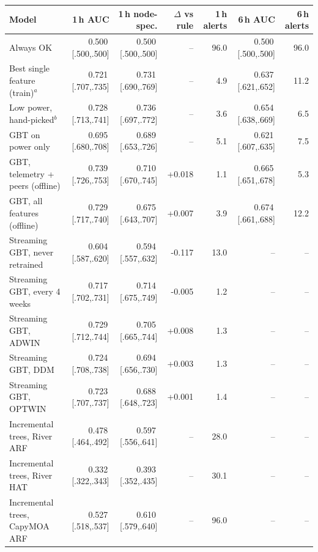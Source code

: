 \begin{tabular}{lrrrrrr}
\toprule
Model & 1\,h AUC & 1\,h node-spec. & $\Delta$ vs rule & 1\,h alerts & 6\,h AUC & 6\,h alerts \\
\midrule
Always OK & 0.500\,{\scriptsize[.500,.500]} & 0.500\,{\scriptsize[.500,.500]} & -- & 96.0 & 0.500\,{\scriptsize[.500,.500]} & 96.0 \\
Best single feature (train)$^a$ & 0.721\,{\scriptsize[.707,.735]} & 0.731\,{\scriptsize[.690,.769]} & -- & 4.9 & 0.637\,{\scriptsize[.621,.652]} & 11.2 \\
Low power, hand-picked$^b$ & 0.728\,{\scriptsize[.713,.741]} & 0.736\,{\scriptsize[.697,.772]} & -- & 3.6 & 0.654\,{\scriptsize[.638,.669]} & 6.5 \\
GBT on power only & 0.695\,{\scriptsize[.680,.708]} & 0.689\,{\scriptsize[.653,.726]} & -- & 5.1 & 0.621\,{\scriptsize[.607,.635]} & 7.5 \\
\midrule
GBT, telemetry + peers (offline) & 0.739\,{\scriptsize[.726,.753]} & 0.710\,{\scriptsize[.670,.745]} & +0.018 & 1.1 & 0.665\,{\scriptsize[.651,.678]} & 5.3 \\
GBT, all features (offline) & 0.729\,{\scriptsize[.717,.740]} & 0.675\,{\scriptsize[.643,.707]} & +0.007 & 3.9 & 0.674\,{\scriptsize[.661,.688]} & 12.2 \\
\midrule
Streaming GBT, never retrained & 0.604\,{\scriptsize[.587,.620]} & 0.594\,{\scriptsize[.557,.632]} & -0.117 & 13.0 & -- & -- \\
Streaming GBT, every 4 weeks & 0.717\,{\scriptsize[.702,.731]} & 0.714\,{\scriptsize[.675,.749]} & -0.005 & 1.2 & -- & -- \\
Streaming GBT, ADWIN & 0.729\,{\scriptsize[.712,.744]} & 0.705\,{\scriptsize[.665,.744]} & +0.008 & 1.3 & -- & -- \\
Streaming GBT, DDM & 0.724\,{\scriptsize[.708,.738]} & 0.694\,{\scriptsize[.656,.730]} & +0.003 & 1.3 & -- & -- \\
Streaming GBT, OPTWIN & 0.723\,{\scriptsize[.707,.737]} & 0.688\,{\scriptsize[.648,.723]} & +0.001 & 1.4 & -- & -- \\
Incremental trees, River ARF & 0.478\,{\scriptsize[.464,.492]} & 0.597\,{\scriptsize[.556,.641]} & -- & 28.0 & -- & -- \\
Incremental trees, River HAT & 0.332\,{\scriptsize[.322,.343]} & 0.393\,{\scriptsize[.352,.435]} & -- & 30.1 & -- & -- \\
Incremental trees, CapyMOA ARF & 0.527\,{\scriptsize[.518,.537]} & 0.610\,{\scriptsize[.579,.640]} & -- & 96.0 & -- & -- \\
\bottomrule
\end{tabular}
